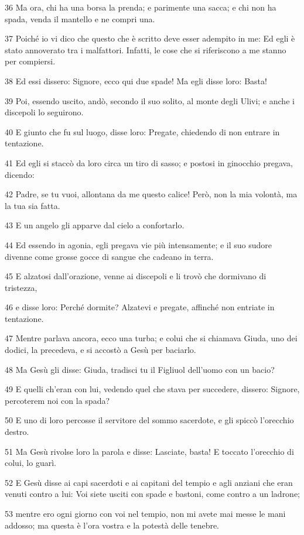 \par 36 Ma ora, chi ha una borsa la prenda; e parimente una sacca; e chi non ha spada, venda il mantello e ne compri una.
\par 37 Poiché io vi dico che questo che è scritto deve esser adempito in me: Ed egli è stato annoverato tra i malfattori. Infatti, le cose che si riferiscono a me stanno per compiersi.
\par 38 Ed essi dissero: Signore, ecco qui due spade! Ma egli disse loro: Basta!
\par 39 Poi, essendo uscito, andò, secondo il suo solito, al monte degli Ulivi; e anche i discepoli lo seguirono.
\par 40 E giunto che fu sul luogo, disse loro: Pregate, chiedendo di non entrare in tentazione.
\par 41 Ed egli si staccò da loro circa un tiro di sasso; e postosi in ginocchio pregava, dicendo:
\par 42 Padre, se tu vuoi, allontana da me questo calice! Però, non la mia volontà, ma la tua sia fatta.
\par 43 E un angelo gli apparve dal cielo a confortarlo.
\par 44 Ed essendo in agonia, egli pregava vie più intensamente; e il suo sudore divenne come grosse gocce di sangue che cadeano in terra.
\par 45 E alzatosi dall'orazione, venne ai discepoli e li trovò che dormivano di tristezza,
\par 46 e disse loro: Perché dormite? Alzatevi e pregate, affinché non entriate in tentazione.
\par 47 Mentre parlava ancora, ecco una turba; e colui che si chiamava Giuda, uno dei dodici, la precedeva, e si accostò a Gesù per baciarlo.
\par 48 Ma Gesù gli disse: Giuda, tradisci tu il Figliuol dell'uomo con un bacio?
\par 49 E quelli ch'eran con lui, vedendo quel che stava per succedere, dissero: Signore, percoterem noi con la spada?
\par 50 E uno di loro percosse il servitore del sommo sacerdote, e gli spiccò l'orecchio destro.
\par 51 Ma Gesù rivolse loro la parola e disse: Lasciate, basta! E toccato l'orecchio di colui, lo guarì.
\par 52 E Gesù disse ai capi sacerdoti e ai capitani del tempio e agli anziani che eran venuti contro a lui: Voi siete usciti con spade e bastoni, come contro a un ladrone;
\par 53 mentre ero ogni giorno con voi nel tempio, non mi avete mai messe le mani addosso; ma questa è l'ora vostra e la potestà delle tenebre.
